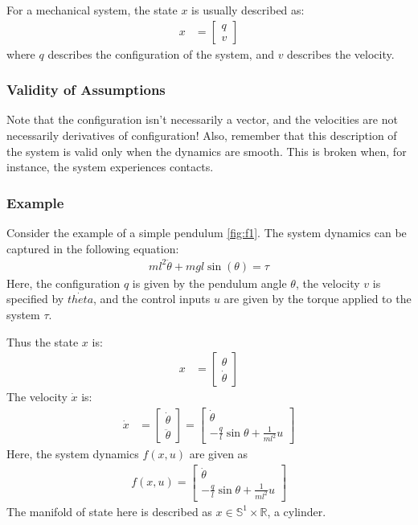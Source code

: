 \documentclass{article}
\begin{document}
\noindent
For a mechanical system, the state $x$ is usually described as:
\begin{align}
    x &= \begin{bmatrix}
            q \\
            v
        \end{bmatrix}
\end{align}
where $q$ describes the configuration of the system, and $v$ describes the velocity. 

\subsubsection{Validity of Assumptions}
Note that the configuration isn't necessarily a vector, and the velocities are not necessarily derivatives of configuration! Also, remember that this description of the system is valid only when the dynamics are smooth. This is broken when, for instance, the system experiences contacts. 

\subsubsection{Example}
Consider the example of a simple pendulum \cref{fig:f1}. The system dynamics can be captured in the following equation: 
\begin{align}
    m l^2 \ddot{\theta} + m g l \sin(\theta) = \tau
\end{align}
Here, the configuration $q$ is given by the pendulum angle $\theta$, the velocity $v$ is specified by $\dot{theta}$, and the control inputs $u$ are given by the torque applied to the system $\tau$.

\noindent
Thus the state $x$ is: 
\begin{align}
    x &= \begin{bmatrix}
            \theta \\
            \dot{\theta} 
        \end{bmatrix}
\end{align} 
The velocity $\dot{x}$ is:
\begin{align}
    \dot{x} &= \begin{bmatrix} 
            \dot{\theta}  \\
            \ddot{\theta} 
        \end{bmatrix}
        = 
        \begin{bmatrix}
            \dot{\theta} \\
            -\frac{q}{l} \sin{\theta} + \frac{1}{m l^2} u
        \end{bmatrix}
\end{align} 
Here, the system dynamics $f(x,u)$ are given as 
\begin{align}
    f(x,u) = 
        \begin{bmatrix}
            \dot{\theta} \\
            -\frac{q}{l} \sin{\theta} + \frac{1}{m l^2} u
        \end{bmatrix}
\end{align} 
The manifold of state here is described as $x \in \mathbb{S}^1 \times \mathbb{R}$, a cylinder.
\end{document}
